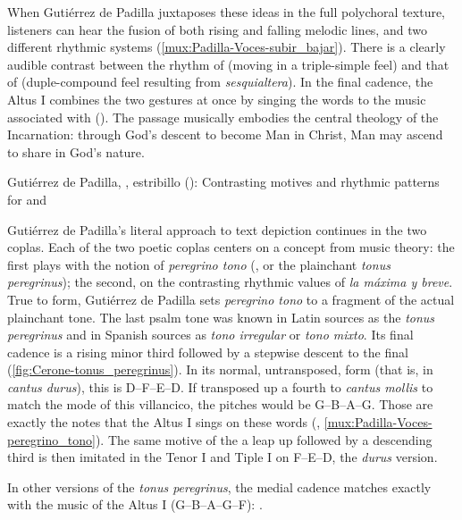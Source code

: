 When Gutiérrez de Padilla juxtaposes these ideas in the full polychoral texture,
listeners can hear the fusion of both rising and falling melodic lines, and two
different rhythmic systems (\cref{mux:Padilla-Voces-subir_bajar}).
There is a clearly audible contrast between the rhythm of  (moving in a triple-simple feel) and that of 
(duple-compound feel resulting from \emph{sesquialtera}).
In the final cadence, the Altus I combines the two gestures at once by singing
the words  to the music associated with
 ().
The passage musically embodies the central theology of the Incarnation: through
God's descent to become Man in Christ, Man may ascend to share in God's nature.

{Gutiérrez de Padilla, , estribillo
(): Contrasting motives and rhythmic patterns for  and }

Gutiérrez de Padilla's literal approach to text depiction continues in the two
coplas.
Each of the two poetic coplas centers on a concept from music theory: the first
plays with the notion of \emph{peregrino tono} (, or the
plainchant \emph{tonus peregrinus}); the second, on the contrasting rhythmic
values of \emph{la máxima y breve}.
True to form, Gutiérrez de Padilla sets \emph{peregrino tono} to a fragment of
the actual plainchant tone.
The last psalm tone was known in Latin sources as the \emph{tonus peregrinus}
and in Spanish sources as \emph{tono irregular} or \emph{tono mixto}.
Its final cadence is a rising minor third followed by a stepwise descent to the
final (\cref{fig:Cerone-tonus_peregrinus}).%
    \Autocite[354]{Cerone:Melopeo}
In its normal, untransposed, form (that is, in \emph{cantus durus}), this is
D--F--E--D.
If transposed up a fourth to \emph{cantus mollis} to match the mode of this
villancico, the pitches would be G--B\fl{}--A--G. 
Those are exactly the notes that the Altus I sings on these words
(, \cref{mux:Padilla-Voces-peregrino_tono}).
The same motive of the a leap up followed by a descending third is then imitated
in the Tenor I and Tiple I on F--E--D, the \emph{durus} version.%
\begin{Footnote}
    In other versions of the \emph{tonus peregrinus}, the medial cadence matches
    exactly with the music of the Altus I (G--B\fl{}--A--G--F):
    \autocite[160]{Catholic:LiberUsualis1956}.
\end{Footnote}

